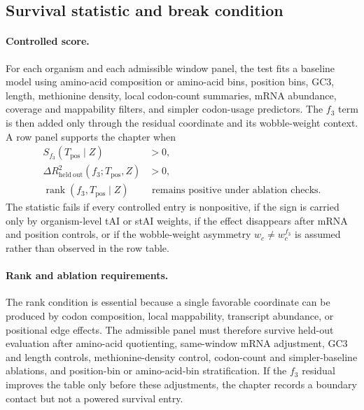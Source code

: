 \subsection{Survival statistic and break condition}
\label{sec:q6-f3-stress-survival-statistic}

\paragraph{Controlled score.}
For each organism and each admissible window panel, the test fits a baseline model using amino-acid composition or amino-acid bins, position bins, GC3, length, methionine density, local codon-count summaries, mRNA abundance, coverage and mappability filters, and simpler codon-usage predictors.  The $f_3$ term is then added only through the residual coordinate and its wobble-weight context.  A row panel supports the chapter when
$$
\begin{aligned}
  S_{f_3}(T_{\mathrm{pos}}\mid Z) &> 0,\\
  \Delta R^2_{\mathrm{held\ out}}(f_3;T_{\mathrm{pos}},Z) &> 0,\\
  \operatorname{rank}(f_3,T_{\mathrm{pos}}\mid Z) &\text{ remains positive under ablation checks}.
\end{aligned}
$$
The statistic fails if every controlled entry is nonpositive, if the sign is carried only by organism-level tAI or stAI weights, if the effect disappears after mRNA and position controls, or if the wobble-weight asymmetry $w_c\neq w_c^{f_3}$ is assumed rather than observed in the row table.

\paragraph{Rank and ablation requirements.}
The rank condition is essential because a single favorable coordinate can be produced by codon composition, local mappability, transcript abundance, or positional edge effects.  The admissible panel must therefore survive held-out evaluation after amino-acid quotienting, same-window mRNA adjustment, GC3 and length controls, methionine-density control, codon-count and simpler-baseline ablations, and position-bin or amino-acid-bin stratification.  If the $f_3$ residual improves the table only before these adjustments, the chapter records a boundary contact but not a powered survival entry.
